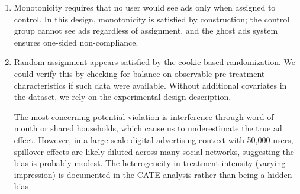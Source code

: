 \documentclass[10pt]{article}
\begin{document}
\begin{enumerate}
\begin{enumerate}
        \item Monotonicity requires that no user would see ads only when assigned to control. In this design, monotonicity is satisfied by construction; the control group cannot see ads regardless of assignment, and the ghost ads system ensures one-sided non-compliance.

        \item Random assignment appears satisfied by the cookie-based randomization. We could verify this by checking for balance on observable pre-treatment characteristics if such data were available. Without additional covariates in the dataset, we rely on the experimental design description. 

        The most concerning potential violation is interference through word-of-mouth or shared households, which cause us to underestimate the true ad effect. However, in a large-scale digital advertising context with 50,000 users, spillover effects are likely diluted across many social networks, suggesting the bias is probably modest. The heterogeneity in treatment intensity (varying impression) is documented in the CATE analysis rather than being a hidden bias 
    \end{enumerate}
\end{enumerate}
\end{document}
